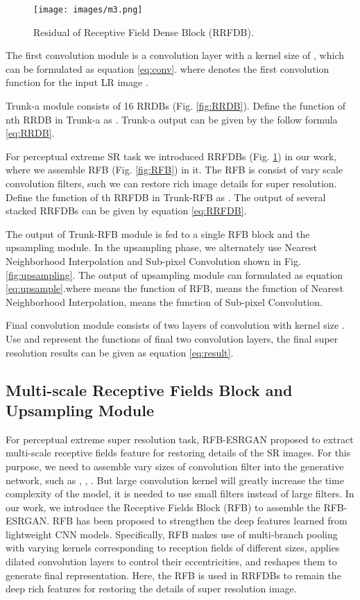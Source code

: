 \documentclass[10pt,twocolumn,letterpaper]{article}
\begin{document}
\begin{figure}[htbp]
\centering 
\texttt{[image: images/m3.png]}
\caption{Residual of Receptive Field Dense Block (RRFDB).}
\label{fig:RRFDB}
\end{figure}


The first convolution module is a convolution layer with a kernel size of , which can be formulated as equation \eqref{eq:conv}. where  denotes the first convolution function for the input LR image .


 Trunk-a module consists of 16 RRDBs (Fig. \ref{fig:RRDB}). Define the function of nth RRDB in Trunk-a as . Trunk-a output can be given by the follow formula \eqref{eq:RRDB}.

For perceptual extreme SR task we introduced RRFDBs (Fig. \ref{fig:RRFDB}) in our work, where we assemble RFB\cite{liu2018receptive} (Fig. \ref{fig:RFB}) in it. The RFB is consist of vary scale convolution filters, such we can restore rich image details for super resolution. Define the function of th RRFDB in Trunk-RFB as . The output of several stacked RRFDBs can be given by equation \eqref{eq:RRFDB}.


The output  of Trunk-RFB module is fed to a single RFB block and the upsampling module. In the upsampling phase, we alternately use Nearest Neighborhood Interpolation and  Sub-pixel Convolution\cite{shi2016real} shown in Fig. \ref{fig:upsampling}. The output of upsampling module can formulated as equation \eqref{eq:upsample}.where  means the function of RFB,  means the function of Nearest Neighborhood Interpolation,  means the function of Sub-pixel Convolution.

 Final convolution module consists of two layers of convolution with kernel size . Use  and  represent the functions of final two convolution layers, the final super resolution results can be given as equation \eqref{eq:result}.


\subsection{Multi-scale Receptive Fields Block and Upsampling Module}
For perceptual extreme super resolution task, RFB-ESRGAN proposed to extract  multi-scale receptive fields feature for restoring details of the SR images. For this purpose, we need to assemble vary sizes of convolution filter into the generative network, such as , , . But large convolution kernel will greatly increase the time complexity of the model, it is needed to use small filters instead of large filters. In our work, we introduce the Receptive Fields Block (RFB) \cite{liu2018receptive} to assemble the RFB-ESRGAN. RFB has been proposed to strengthen the deep features learned from lightweight CNN models. Specifically, RFB makes use of multi-branch pooling with varying kernels corresponding to reception fields of different sizes, applies dilated convolution layers to control their eccentricities, and reshapes them to generate final representation. Here, the RFB is used in RRFDBs to remain the deep rich features for restoring the details of super resolution image.
\end{document}
